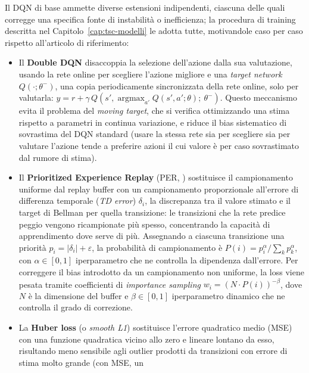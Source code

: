 Il DQN di base ammette diverse estensioni indipendenti, ciascuna delle
quali corregge una specifica fonte di instabilità o inefficienza; la
procedura di training descritta nel Capitolo~\ref{cap:tsc-modelli} le
adotta tutte, motivandole caso per caso rispetto all'articolo di
riferimento:
\begin{itemize}
  \item Il \textbf{Double DQN} \citep{vanhasselt2016double} disaccoppia la
    selezione dell'azione dalla sua valutazione, usando la rete online per
    scegliere l'azione migliore e una \emph{target network}
    $Q(\cdot;\theta^-)$, una copia periodicamente sincronizzata della rete
    online, solo per valutarla:
    $y = r + \gamma\, Q\!\left(s', \operatorname*{argmax}_{a'}
    Q(s',a';\theta);\ \theta^-\right)$. Questo meccanismo evita il problema
    del \emph{moving target}, che si verifica ottimizzando una stima
    rispetto a parametri in continua variazione, e riduce il bias
    sistematico di sovrastima del DQN standard (usare la stessa rete sia
    per scegliere sia per valutare l'azione tende a preferire azioni il
    cui valore è per caso sovrastimato dal rumore di stima).
  \item Il \textbf{Prioritized Experience Replay} (PER,
    \citealp{schaul2016per}) sostituisce il campionamento uniforme dal
    replay buffer con un campionamento proporzionale all'errore di
    differenza temporale (\emph{TD error}) $\delta_i$, la discrepanza tra
    il valore stimato e il target di Bellman per quella transizione: le
    transizioni che la rete predice peggio vengono ricampionate più
    spesso, concentrando la capacità di apprendimento dove serve di più.
    Assegnando a ciascuna transizione una priorità $p_i = |\delta_i| +
    \varepsilon$, la probabilità di campionamento è $P(i) = p_i^\alpha /
    \sum_k p_k^\alpha$, con $\alpha \in [0,1]$ iperparametro che ne
    controlla la dipendenza dall'errore. Per correggere il bias introdotto
    da un campionamento non uniforme, la loss viene pesata tramite
    coefficienti di \emph{importance sampling} $w_i = \left(N \cdot
    P(i)\right)^{-\beta}$, dove $N$ è la dimensione del buffer e $\beta \in
    [0,1]$ iperparametro dinamico che ne controlla il grado di correzione.
  \item La \textbf{Huber loss} (o \emph{smooth L1}) sostituisce l'errore
    quadratico medio (MSE) con una funzione quadratica vicino allo zero e
    lineare lontano da esso, risultando meno sensibile agli outlier
    prodotti da transizioni con errore di stima molto grande (con MSE, un

\end{itemize}
